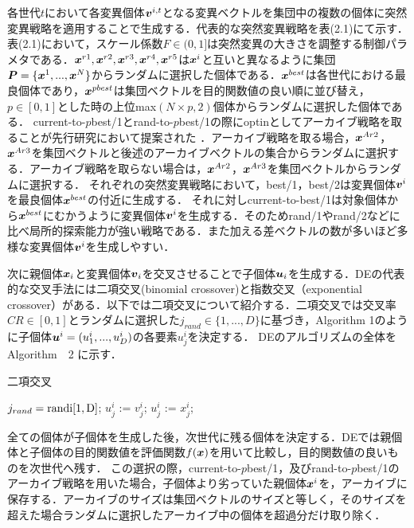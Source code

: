 \documentclass[a4paper,11pt,oneside,openany]{jsbook}
\def\vector#1{\mbox{\boldmath $#1$}}
\begin{document}
各世代$t$において各変異個体${\vector{v}^{i,t}}$となる変異ベクトルを集団中の複数の個体に突然変異戦略を適用することで生成する．代表的な突然変異戦略を表(2.1)にて示す．表(2.1)において，スケール係数${F\in(0,1]}$は突然変異の大きさを調整する制御パラメタである．$\vector{x}^{r1},\vector{x}^{r2},\vector{x}^{r3},\vector{x}^{r4},\vector{x}^{r5}$は${\vector{x}^i}$と互いと異なるように集団$\vector{P} = \{ \vector{x}^1, ..., \vector{x}^N \}$からランダムに選択した個体である．$\vector{x}^{best}$は各世代における最良個体であり，$\vector{x}^{pbest}$は集団ベクトルを目的関数値の良い順に並び替え，${p\in[0,1]}とした時の上位$max$(N \times p, 2)$個体からランダムに選択した個体である．
current-to-$p$best/1とrand-to-$p$best/1の際にoptinとしてアーカイブ戦略を取ることが先行研究において提案された \cite{JADE} ．アーカイブ戦略を取る場合，${\vector{x}^{Ar2}}$，${\vector{x}^{Ar3}}$を集団ベクトルと後述のアーカイブベクトルの集合からランダムに選択する．アーカイブ戦略を取らない場合は，${\vector{x}^{Ar2}}$，${\vector{x}^{Ar3}}$を集団ベクトルからランダムに選択する．
それぞれの突然変異戦略において，best/1，best/2は変異個体{$\vector{v}^i$}を最良個体$\vector{x}^{best}$の付近に生成する．
それに対しcurrent-to-best/1は対象個体から$\vector{x}^{best}$にむかうように変異個体{$\vector{v}^i$}を生成する．そのためrand/1やrand/2などに比べ局所的探索能力が強い戦略である．また加える差ベクトルの数が多いほど多様な変異個体{$\vector{v}^i$}を生成しやすい．

次に親個体$\vector{x}_i$と変異個体$\vector{v}_i$を交叉させることで子個体$\vector{u}_i$を生成する．DEの代表的な交叉手法には二項交叉(binomial crossover)と指数交叉（exponential crossover）がある．以下では二項交叉について紹介する．二項交叉では交叉率$CR \in [0,1]$とランダムに選択した$j_{rand} \in \{1,...,D\}$に基づき，Algorithm 1のように子個体$\vector{u}^i = (u^i_1,...,u^i_D)$の各要素$u^i_j$を決定する．
DEのアルゴリズムの全体をAlgorithm　2 に示す．


\begin{algorithm}
\caption{二項交叉}
\label{alg:pbnf}
\begin{algorithmic}
\STATE $j_{rand} = \rm{randi}[1, D]$;
  \IF {$\rm{rand}[0,1) \leqq $ \OR $j == j_{rand} $}
    \STATE $u^i_j$ := $v^i_j$;
  \ELSE
    \STATE $u^i_j$ := $x^i_j$;
  \ENDIF
\ENDFOR
\end{algorithmic}
\end{algorithm}


全ての個体が子個体を生成した後，次世代に残る個体を決定する．DEでは親個体と子個体の目的関数値を評価関数$f(\vector{x})$を用いて比較し，目的関数値の良いものを次世代へ残す．
この選択の際，current-to-$p$best/1，及びrand-to-$p$best/1のアーカイブ戦略を用いた場合，子個体より劣っていた親個体$\vector{x}^i$を，アーカイブに保存する．アーカイブのサイズは集団ベクトルのサイズと等しく，そのサイズを超えた場合ランダムに選択したアーカイブ中の個体を超過分だけ取り除く．
\end{document}
